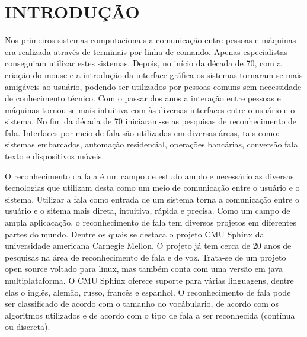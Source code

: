 \chapter{INTRODUÇÃO}
\label{chap:introducao}
 \thispagestyle{plain}


\quad Nos primeiros sistemas computacionais a comunicação entre pessoas e máquinas era realizada através de terminais por linha de comando.  Apenas especialistas conseguiam utilizar estes sistemas.
Depois, no início da década de 70, com a criação do mouse e a introdução da interface gráfica  os sistemas tornaram-se mais amigáveis ao usuário, podendo ser utilizados por pessoas comuns sem necessidade de conhecimento técnico. Com o passar dos anos a interação entre pessoas e máquinas tornou-se mais intuitiva com às diversas interfaces entre o usuário e o sistema. No fim da década de 70 iniciaram-se as pesquisas de reconhecimento de fala.
Interfaces por meio de fala são utilizadas em diversas áreas, tais como: sistemas embarcados, automação residencial, operações bancárias, conversão fala texto e dispositivos móveis.

\quad O reconhecimento da fala é um campo de estudo amplo e necessário as diversas tecnologias que utilizam
desta como um  meio de comunicação entre o usuário e o sistema. Utilizar a fala como entrada de um sistema
torna a comunicação entre o usuário e o sitema mais direta, intuitiva, rápida e precisa. Como um campo de ampla aplicacação, o reconhecimento de fala tem diversos projetos em diferentes partes do mundo. Dentre os quais se destaca o projeto CMU Sphinx da universidade americana Carnegie Mellon. O projeto já tem cerca de 20 anos de pesquisas na área de reconhecimento de fala e de voz. Trata-se de um projeto open source voltado para linux, mas também conta com uma versão em java multiplataforma. O CMU Sphinx oferece suporte para várias linguagens, dentre elas o inglês, alemão, russo, francês e espanhol. 
O reconhecimento de fala pode ser classificado de acordo com o tamanho do vocábulario, de acordo com os algoritmos utilizados e de acordo com o tipo de fala a ser reconhecida (contínua ou discreta).




